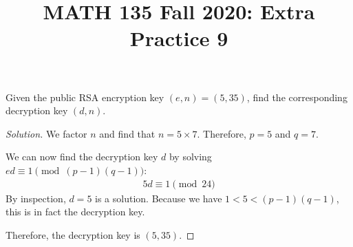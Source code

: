 
\usepackage{minted}

\title{MATH 135 Fall 2020: Extra Practice 9}


\thispagestyle{firstpage}

\textbf{\@title}


\question Given the public RSA encryption key $(e, n) = (5, 35)$,
find the corresponding decryption key $(d, n)$.
\begin{proof}[Solution]
  We factor $n$ and find that $n = 5 \times 7$.
  Therefore, $p=5$ and $q=7$.

  We can now find the decryption key $d$ by solving $ed \equiv 1 \pmod{(p-1)(q-1)}$:
  \begin{align*}
    5d \equiv 1 \pmod{24}
  \end{align*}
  By inspection, $d=5$ is a solution.
  Because we have $1 < 5 < (p-1)(q-1)$, this is in fact the decryption key.

  Therefore, the decryption key is $(5, 35)$.
\end{proof}



